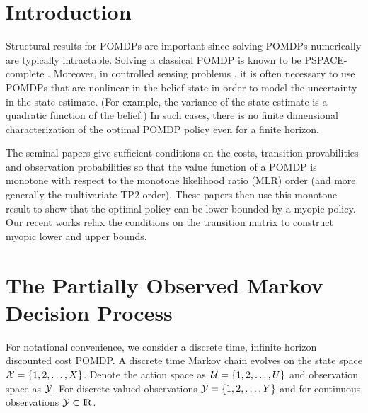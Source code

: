 \documentclass[draftcls,onecolumn]{IEEEtran}
\begin{document}
\section{Introduction}
Structural results for POMDPs are important since solving POMDPs numerically are typically intractable. Solving a classical POMDP is known to be PSPACE-complete
\cite{PT87}.
Moreover, in controlled sensing problems \cite{Kri02,KD09,EKN05}, it is often necessary to use POMDPs that are 
nonlinear in the belief state in order to model the uncertainty in the state estimate. (For example, the variance of the state estimate is a quadratic function of the belief.)
In such cases, there is no finite dimensional characterization of the optimal POMDP policy even for a finite horizon.


The seminal papers \cite{Lov87,Rie91,RZ94} give sufficient conditions on the costs, transition provabilities and observation probabilities so  that the value function of a POMDP is monotone with respect to 
the monotone likelihood ratio  (MLR) order (and more generally the multivariate TP2 order).
These papers then use this monotone  result  to show that the optimal policy
can be lower bounded by a myopic policy. 
Our recent works \cite{Kri16,KP15} relax the conditions on the transition matrix to construct myopic lower and upper bounds.  





\section {The Partially Observed Markov Decision Process} \label{sec:pomdp}
For notational convenience, we consider  a discrete time, infinite horizon discounted cost POMDP. A   discrete time Markov chain  evolves on the  state space $\mathcal{X} = \{1,2,\ldots, X\}$. Denote the
action space  as $\,\mathcal{U} = \{1,2,\ldots,U\}$ and observation space as $\mathcal{Y}$. For discrete-valued observations $\mathcal{Y} = \{1,2,\ldots,{Y}\}$ and for continuous observations $\obspace \subset \reals$.
\end{document}
